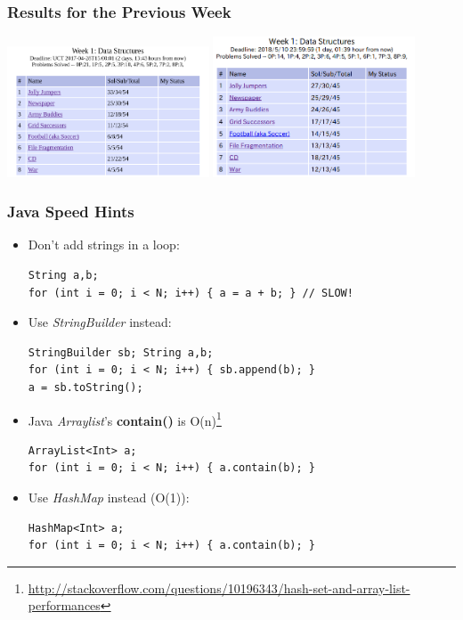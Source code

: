 \begin{frame}
  \frametitle{Results for the Previous Week}

  \begin{center}    
    \includegraphics[width=0.45\textwidth]{img/resultsW1_2017}
    \includegraphics[width=0.45\textwidth]{img/resultsW1_2018}
  \end{center}
\end{frame}

\begin{frame}[fragile]
  \frametitle{Java Speed Hints}

  \begin{itemize}
      \item Don't add strings in a loop:
    {\small
\begin{verbatim}
String a,b;
for (int i = 0; i < N; i++) { a = a + b; } // SLOW!
\end{verbatim}
    }
  \item Use \emph{StringBuilder} instead:
    {\small
\begin{verbatim}
StringBuilder sb; String a,b;
for (int i = 0; i < N; i++) { sb.append(b); }
a = sb.toString();
\end{verbatim}
    }

  \item Java \emph{Arraylist}'s {\bf contain()} is O(n)\footnote{\url{http://stackoverflow.com/questions/10196343/hash-set-and-array-list-performances}}
    {\small
\begin{verbatim}
ArrayList<Int> a;
for (int i = 0; i < N; i++) { a.contain(b); }
\end{verbatim}
    }
  \item Use \emph{HashMap} instead (O(1)):
    {\small
\begin{verbatim}
HashMap<Int> a;
for (int i = 0; i < N; i++) { a.contain(b); }
\end{verbatim}
    }
  \end{itemize}
\end{frame}

